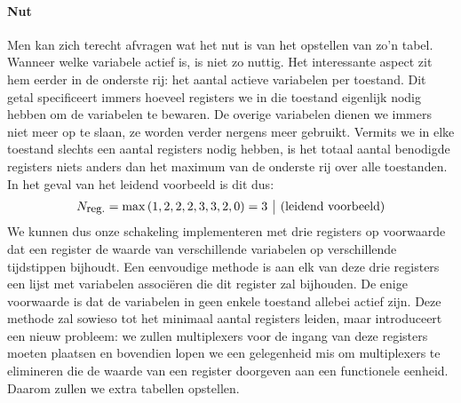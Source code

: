 \paragraph{Nut}Men kan zich terecht afvragen wat het nut is van het opstellen van zo'n tabel. Wanneer welke variabele actief is, is niet zo nuttig. Het interessante aspect zit hem eerder in de onderste rij: het aantal actieve variabelen per toestand. Dit getal specificeert immers hoeveel registers we in die toestand eigenlijk nodig hebben om de variabelen te bewaren. De overige variabelen dienen we immers niet meer op te slaan, ze worden verder nergens meer gebruikt. Vermits we in elke toestand slechts een aantal registers nodig hebben, is het totaal aantal benodigde registers niets anders dan het maximum van de onderste rij over alle toestanden. In het geval van het leidend voorbeeld is dit dus:
\begin{equation}
\begin{array}{l|l}
N_{\small{\mbox{reg.}}}=\max{\left(1,2,2,2,3,3,2,0\right)}=3&\mbox{(leidend voorbeeld)}
\end{array}
\end{equation}
We kunnen dus onze schakeling implementeren met drie registers op voorwaarde dat een register de waarde van verschillende variabelen op verschillende tijdstippen bijhoudt. Een eenvoudige methode is aan elk van deze drie registers een lijst met variabelen associ\"eren die dit register zal bijhouden. De enige voorwaarde is dat de variabelen in geen enkele toestand allebei actief zijn. Deze methode zal sowieso tot het minimaal aantal registers leiden, maar introduceert een nieuw probleem: we zullen multiplexers voor de ingang van deze registers moeten plaatsen en bovendien lopen we een gelegenheid mis om multiplexers te elimineren die de waarde van een register doorgeven aan een functionele eenheid. Daarom zullen we extra tabellen opstellen.
